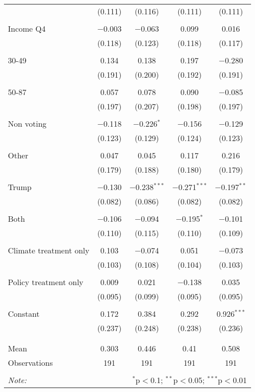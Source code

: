 \begin{tabular}{@{\extracolsep{5pt}}lcccc}
  & (0.111) & (0.116) & (0.111) & (0.111) \\ 
  & & & & \\ 
 Income Q4 & $-$0.003 & $-$0.063 & 0.099 & 0.016 \\ 
  & (0.118) & (0.123) & (0.118) & (0.117) \\ 
  & & & & \\ 
 30-49 & 0.134 & 0.138 & 0.197 & $-$0.280 \\ 
  & (0.191) & (0.200) & (0.192) & (0.191) \\ 
  & & & & \\ 
 50-87 & 0.057 & 0.078 & 0.090 & $-$0.085 \\ 
  & (0.197) & (0.207) & (0.198) & (0.197) \\ 
  & & & & \\ 
 Non voting & $-$0.118 & $-$0.226$^{*}$ & $-$0.156 & $-$0.129 \\ 
  & (0.123) & (0.129) & (0.124) & (0.123) \\ 
  & & & & \\ 
 Other & 0.047 & 0.045 & 0.117 & 0.216 \\ 
  & (0.179) & (0.188) & (0.180) & (0.179) \\ 
  & & & & \\ 
 Trump & $-$0.130 & $-$0.238$^{***}$ & $-$0.271$^{***}$ & $-$0.197$^{**}$ \\ 
  & (0.082) & (0.086) & (0.082) & (0.082) \\ 
  & & & & \\ 
 Both & $-$0.106 & $-$0.094 & $-$0.195$^{*}$ & $-$0.101 \\ 
  & (0.110) & (0.115) & (0.110) & (0.109) \\ 
  & & & & \\ 
 Climate treatment only & 0.103 & $-$0.074 & 0.051 & $-$0.073 \\ 
  & (0.103) & (0.108) & (0.104) & (0.103) \\ 
  & & & & \\ 
 Policy treatment only & 0.009 & 0.021 & $-$0.138 & 0.035 \\ 
  & (0.095) & (0.099) & (0.095) & (0.095) \\ 
  & & & & \\ 
 Constant & 0.172 & 0.384 & 0.292 & 0.926$^{***}$ \\ 
  & (0.237) & (0.248) & (0.238) & (0.236) \\ 
  & & & & \\ 
\hline \\[-1.8ex] 
Mean & 0.303 & 0.446 & 0.41 & 0.508 \\ 
Observations & 191 & 191 & 191 & 191 \\ 
\hline 
\hline \\[-1.8ex] 
\textit{Note:}  & \multicolumn{4}{r}{$^{*}$p$<$0.1; $^{**}$p$<$0.05; $^{***}$p$<$0.01} \\ 
\end{tabular} 
